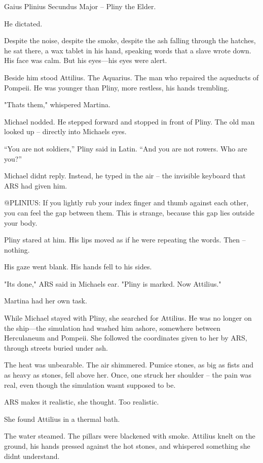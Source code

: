 \documentclass[
]{article}
\begin{document}
Gaius Plinius Secundus Major -- Pliny the Elder.

He dictated.

Despite the noise, despite the smoke, despite the ash falling through the hatches, he sat there, a wax tablet in his hand, speaking words that a slave wrote down. His face was calm. But his eyes---his eyes were alert.

Beside him stood Attilius. The Aquarius. The man who repaired the aqueducts of Pompeii. He was younger than Pliny, more restless, his hands trembling.

"That\textquotesingle s them," whispered Martina.

Michael nodded. He stepped forward and stopped in front of Pliny. The old man looked up -- directly into Michael\textquotesingle s eyes.

``You are not soldiers,'' Pliny said in Latin. ``And you are not rowers. Who are you?''

Michael didn\textquotesingle t reply. Instead, he typed in the air -- the invisible keyboard that ARS had given him.

@PLINIUS: If you lightly rub your index finger and thumb against each other, you can feel the gap between them. This is strange, because this gap lies outside your body.

Pliny stared at him. His lips moved as if he were repeating the words. Then -- nothing.

His gaze went blank. His hands fell to his sides.

"It\textquotesingle s done," ARS said in Michael\textquotesingle s ear. "Pliny is marked. Now Attilius."

Martina had her own task.

While Michael stayed with Pliny, she searched for Attilius. He was no longer on the ship---the simulation had washed him ashore, somewhere between Herculaneum and Pompeii. She followed the coordinates given to her by ARS, through streets buried under ash.

The heat was unbearable. The air shimmered. Pumice stones, as big as fists and as heavy as stones, fell above her. Once, one struck her shoulder -- the pain was real, even though the simulation wasn\textquotesingle t supposed to be.

ARS makes it realistic, she thought. Too realistic.

She found Attilius in a thermal bath.

The water steamed. The pillars were blackened with smoke. Attilius knelt on the ground, his hands pressed against the hot stones, and whispered something she didn\textquotesingle t understand.
\end{document}
